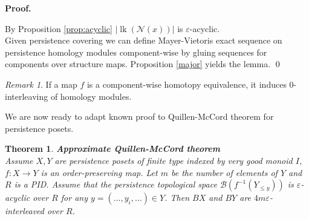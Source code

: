 \documentclass[english,12pt]{article}
\newcounter{stmcounter}[section]
\newcounter{thcounter}
\numberwithin{equation}{section}
\newtheorem{theorem}[thcounter]{Theorem}
\theoremstyle{definition}
\theoremstyle{remark}
\newtheorem{remark}[stmcounter]{Remark}
\newenvironment{pf}{\noindent\textbf{Proof.}}{\qed}
\begin{document}
\begin{pf} ~ \par
  By Proposition \ref{prop:acyclic} $\left|\operatorname{lk}(\mathcal{N}(x))\right|$ is $\varepsilon$-acyclic.\\

  Given persistence covering we can define Mayer-Vietoris exact sequence on persistence homology modules component-wise by gluing sequences for components over structure maps. Proposition \ref{major} yields the lemma.
\end{pf}

\begin{remark}
  If a map $f$ is a component-wise homotopy equivalence, it induces $0$-interleaving of homology modules.
\end{remark}

We are now ready to adapt known proof to Quillen-McCord theorem for persistence posets.

\begin{theorem} \textbf{Approximate Quillen-McCord theorem}\\
  Assume $X, Y$ are persistence posets of finite type indexed by very good monoid $I$, $f : X \to Y$ is an order-preserving map. Let $m$ be the number of elements of $Y$ and $R$ is a PID. Assume that the persistence topological space $\mathcal{B}(f^{-1}(Y_{\leqslant y}))$ is $\varepsilon$-acyclic over $R$ for any $y=(\ldots,y_i,\ldots) \in Y$. Then $BX$ and $BY$ are $4m\varepsilon$-interleaved over $R$.\\
\end{theorem}
\end{document}
